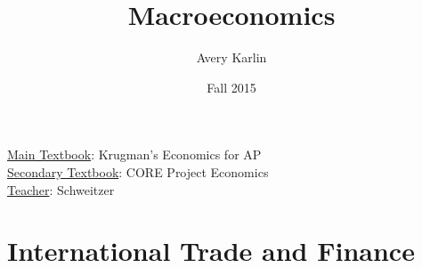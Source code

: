 \documentclass[11 pt, twoside]{article}
\begin{document}
\title{Macroeconomics}
\author{Avery Karlin}
\date{Fall 2015}

\maketitle
\newpage
\tableofcontents
\vspace{11pt}
\noindent
\underline{Main Textbook}: Krugman's Economics for AP\\
\underline{Secondary Textbook}: CORE Project Economics\\
\underline{Teacher}: Schweitzer
\newpage





\section{International Trade and Finance}
\end{document}
